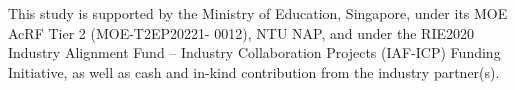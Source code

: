 \begin{ack}
This study is supported by the Ministry of Education, Singapore, under its MOE AcRF Tier 2 (MOE-T2EP20221- 0012), NTU NAP, and under the RIE2020 Industry Alignment Fund – Industry Collaboration Projects (IAF-ICP) Funding Initiative, as well as cash and in-kind contribution from the industry partner(s).
\end{ack}